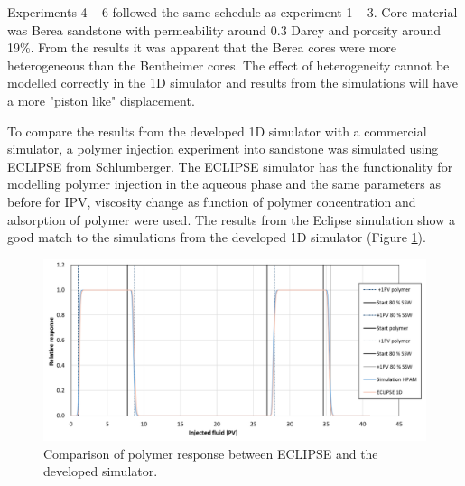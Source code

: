 \documentclass[nanomaterials,article,submit,moreauthors,pdftex]{Definitions/mdpi}
\begin{document}
Experiments 4 – 6 followed the same schedule as experiment 1 – 3. Core material was Berea sandstone with permeability around 0.3 Darcy and porosity around 19\%. From the results it was apparent that the Berea cores were more heterogeneous than the Bentheimer cores. The effect of heterogeneity cannot be modelled correctly in the 1D simulator and results from the simulations will have a more "piston like" displacement.

To compare the results from the developed 1D simulator with a commercial simulator, a polymer injection experiment into sandstone was simulated using ECLIPSE from Schlumberger.
The ECLIPSE simulator has the functionality for modelling polymer injection in the aqueous phase and the same parameters as before for IPV, viscosity change as function of polymer concentration and adsorption of polymer were used. The results from the Eclipse simulation show a good match to the simulations from the developed 1D simulator (Figure \ref{cht:simEcl}).

\begin{figure}[h!]
    \centering
    \includegraphics[width=.8\textwidth]{fig/simEcl.png}
    \caption{Comparison of polymer response between ECLIPSE and the developed simulator.}
    \label{cht:simEcl}
\end{figure}


\end{document}
